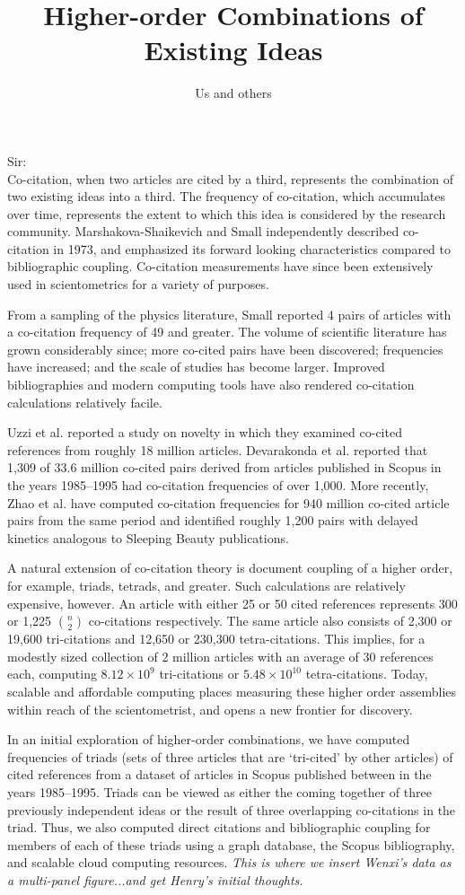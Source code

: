 \documentclass[notitlepage]{report}
\title{Higher-order Combinations of Existing Ideas}
\author{Us and others}
\date{}
\begin{document}
\maketitle
\thispagestyle{empty}
Sir:\\

Co-citation, when two articles are cited by a third, represents the combination of two existing ideas into a third. The frequency of co-citation, which accumulates over time, represents the extent to which this idea is considered by the research community. Marshakova-Shaikevich and Small independently described co-citation in 1973, and emphasized its forward looking characteristics compared to bibliographic coupling.  Co-citation measurements have since been extensively used in scientometrics for a variety of purposes.

From a sampling of the physics literature, Small reported 4 pairs of articles with a co-citation frequency of 49 and greater. The volume of scientific literature has grown considerably since; more co-cited pairs have been discovered; frequencies have increased; and the scale of studies has become larger. Improved bibliographies and modern computing tools have also rendered co-citation calculations relatively facile. 

Uzzi et al. reported a study on novelty in which they examined co-cited references from roughly 18 million articles. Devarakonda et al. reported that 1,309 of 33.6 million co-cited pairs derived from articles published in Scopus in the years 1985--1995 had co-citation frequencies of over 1,000. More recently, Zhao et al. have computed co-citation frequencies for 940 million co-cited article pairs from the same period and identified roughly 1,200 pairs with delayed kinetics analogous to Sleeping Beauty publications. 

A natural extension of co-citation theory is document coupling of a higher order, for example, triads, tetrads, and greater. Such calculations are relatively expensive, however. An article with either 25 or 50 cited references represents 300 or 1,225 $n\choose2$ co-citations respectively. The same article also consists of  2,300 or 19,600 tri-citations and  12,650 or  230,300 tetra-citations. This implies, for a modestly sized collection of 2 million articles with an average of 30 references each, computing $8.12 \times10^9$ tri-citations or $5.48 \times 10^{10}$ tetra-citations. Today, scalable and affordable computing places measuring these higher order assemblies within reach of the scientometrist, and opens a new frontier for discovery.

In an initial exploration of higher-order combinations, we have computed frequencies of triads (sets of three articles that are `tri-cited' by other articles) of cited references from a dataset of articles in Scopus published between in the years 1985--1995. Triads can be viewed as either the coming together of three previously independent ideas or the result of three overlapping co-citations in the triad. Thus, we also computed direct citations and bibliographic coupling for members of each of these triads using a graph database, the Scopus bibliography, and scalable cloud computing resources. \emph{This is where we insert Wenxi's data as a multi-panel figure...and get Henry's initial thoughts.}
\end{document}
